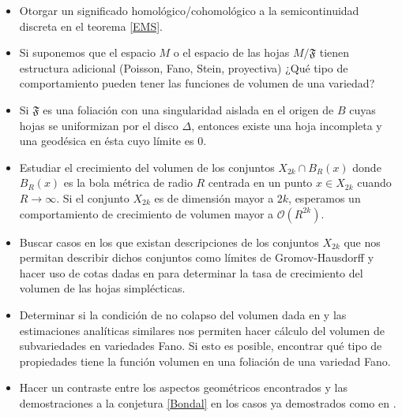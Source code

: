 \documentclass{article}
\begin{document}
\begin{itemize}
        \item Otorgar un significado homol\'ogico/cohomol\'ogico a la semicontinuidad discreta en el teorema \ref{EMS}.

        \item Si suponemos que el espacio $M$ o el espacio de las hojas $M/\mathfrak{F}$ tienen estructura adicional (Poisson, Fano, Stein, proyectiva) 
        ¿Qu\'e tipo de comportamiento pueden tener las funciones de volumen de una variedad?

        \item Si $\mathfrak{F}$ es una foliaci\'on con una singularidad aislada en el origen de $B$ cuyas hojas se uniformizan por el disco $\Delta$,
        entonces existe una hoja incompleta y una geod\'esica en \'esta cuyo l\'imite es $0$.  

        \item Estudiar el crecimiento del volumen de los conjuntos $X_{2k}\cap B_{R}(x)$ donde $B_R(x)$ es la bola m\'etrica 
        de radio $R$ centrada en un punto $x\in X_{2k}$ cuando $R\rightarrow\infty$. Si el conjunto $X_{2k}$ es 
        de dimensi\'on mayor a $2k$, esperamos un comportamiento de crecimiento de volumen mayor a $\mathcal{O}(R^{2k}).$
        
        \item Buscar casos en los que existan descripciones de los conjuntos $X_{2k}$ que nos permitan describir dichos conjuntos
        como l\'imites de Gromov-Hausdorff y hacer uso de cotas dadas en \cite{D-SS} para determinar la tasa de crecimiento
        del volumen de las hojas simpl\'ecticas.

        \item Determinar si la condici\'on de no colapso del volumen dada en \cite{D-SS} y las estimaciones anal\'iticas similares
        nos permiten hacer c\'alculo del volumen de subvariedades en variedades Fano. Si esto es posible, encontrar
        qu\'e tipo de propiedades tiene la funci\'on volumen en una foliaci\'on de una variedad Fano.

        \item Hacer un contraste entre los aspectos geom\'etricos encontrados y las demostraciones a la conjetura \ref{Bondal} en los
        casos ya demostrados como en \cite{Gua-Pym}.
\end{itemize}
\end{document}
